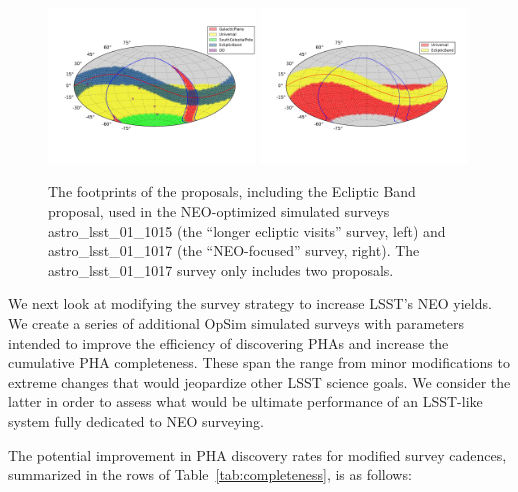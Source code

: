 \begin{figure}[t!]
	\centering
	\includegraphics[width=0.49\textwidth]{figures/astro_lsst_01_1015_proposal_footprint}
	\includegraphics[width=0.49\textwidth]{figures/astro_lsst_01_1017_proposal_footprint}
	\vskip -0.5in
	\caption{The footprints of the proposals, including the Ecliptic Band proposal, used in the NEO-optimized simulated surveys astro\_lsst\_01\_1015 (the ``longer ecliptic visits'' survey, left) and astro\_lsst\_01\_1017 (the ``NEO-focused'' survey, right). The astro\_lsst\_01\_1017 survey only includes two proposals.
		\label{fig:neo_footprints}}
\end{figure}

We next look at modifying the survey strategy to increase LSST's NEO yields. We create a series of additional OpSim simulated surveys with parameters intended to improve the efficiency of discovering PHAs and increase the cumulative PHA completeness. These span the range from minor modifications to extreme changes that would jeopardize other LSST science goals. We consider the latter in order to assess what would be ultimate performance of an LSST-like system fully dedicated to NEO surveying.

The potential improvement in PHA discovery rates for modified survey cadences,
summarized in the rows of Table~\ref{tab:completeness}, is as follows:

